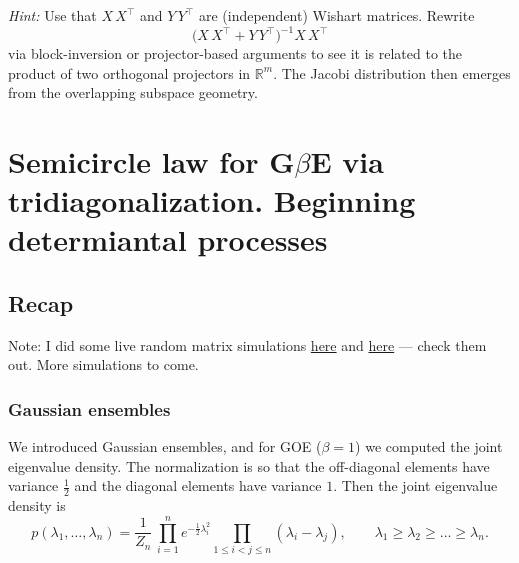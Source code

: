 \documentclass[letterpaper,11pt,oneside,reqno]{book}
\numberwithin{equation}{chapter}  %
\theoremstyle{definition}
\begin{document}
\noindent
\emph{Hint:}
Use that \(X\,X^\top\) and \(Y\,Y^\top\) are (independent) Wishart matrices. Rewrite
\[\bigl(X\,X^\top + Y\,Y^\top\bigr)^{-1}X\,X^\top\] via block-inversion or projector-based arguments to see it is related to the product of two orthogonal projectors in \(\mathbb{R}^{m}\). The Jacobi distribution then emerges from the overlapping subspace geometry.



































\chapter{Semicircle law for G$\beta$E via tridiagonalization. Beginning determiantal processes}
\label{chap:lecture4}




\section{Recap}

Note: I did some live random matrix simulations
\href{https://lpetrov.cc/simulations/2025-01-28-goe/}{here}
and
\href{https://lpetrov.cc/simulations/2025-01-28-bbp-transition/}{here}
--- check them out. More simulations to come.

\subsection{Gaussian ensembles}

We introduced Gaussian ensembles,
and for GOE ($\beta=1$) we computed the joint eigenvalue density.
The normalization is so that the off-diagonal elements have variance $\frac{1}{2}$
and the diagonal elements have variance $1$.
Then the joint eigenvalue density is
\begin{equation*}
	p(\lambda_1,\ldots,\lambda_n)
	=
	\frac{1}{Z_n}\,
	\prod_{i=1}^n e^{-\frac{1}{2}\lambda_i^2}
	\prod_{1\le i<j\le n}(\lambda_i - \lambda_j),
	\qquad
	\lambda_1\ge \lambda_2\ge \ldots \ge \lambda_n.
\end{equation*}
\end{document}
